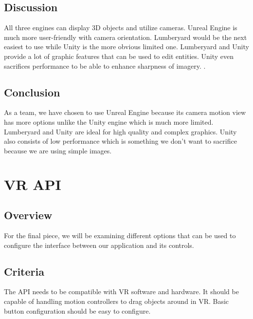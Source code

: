 \documentclass[onecolumn, draftclsnofoot,10pt, compsoc]{IEEEtran}
\begin{document}
\subsection{Discussion}
\begin{singlespace}
All three engines can display 3D objects and utilize cameras. Unreal Engine is much more user-friendly with camera orientation. Lumberyard would be the next easiest to use while Unity is the more obvious limited one. Lumberyard and Unity provide a lot of graphic features that can be used to edit entities. Unity even sacrifices performance to be able to enhance sharpness of imagery. . 
\end{singlespace}

\subsection{Conclusion}
\begin{singlespace}
As a team, we have chosen to use Unreal Engine because its camera motion view has more options unlike the Unity engine which is much more limited. Lumberyard and Unity are ideal for high quality and complex graphics. Unity also consists of low performance which is something we don’t want to sacrifice because we are using simple images.  
\end{singlespace}

\section{VR API}
\subsection{Overview}
\begin{singlespace}
For the final piece, we will be examining different options that can be used to configure the interface between our application and its controls.  
\end{singlespace}

\subsection{Criteria}
\begin{singlespace}
The API needs to be compatible with VR software and hardware. It should be capable of handling motion controllers to drag objects around in VR. Basic button configuration should be easy to configure.   
\end{singlespace}
\end{document}
